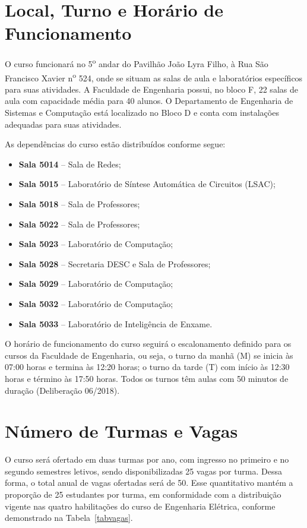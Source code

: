 \section{Local, Turno e Horário de Funcionamento}

O curso funcionará no 5\textsuperscript{o} andar do Pavilhão João Lyra Filho, à Rua São Francisco Xavier n\textsuperscript{o} 524, onde se situam as salas de aula e laboratórios específicos para suas atividades. A Faculdade de Engenharia possui, no bloco F, 22 salas de aula com capacidade média
para 40 alunos. O Departamento de Engenharia de Sistemas e Computação está localizado no Bloco D e conta com instalações adequadas para suas atividades.



As dependências do curso estão distribuídos conforme segue:
\begin{itemize}
    \item \textbf{Sala 5014} -- Sala de Redes;
    \item \textbf{Sala 5015} -- Laboratório de Síntese Automática de Circuitos (LSAC);
    \item \textbf{Sala 5018} -- Sala de Professores;
    \item \textbf{Sala 5022} -- Sala de Professores;
    \item \textbf{Sala 5023} -- Laboratório de Computação;
    \item \textbf{Sala 5028} -- Secretaria DESC e Sala de Professores;
    \item \textbf{Sala 5029} -- Laboratório de Computação;
    \item \textbf{Sala 5032} -- Laboratório de Computação;
    \item \textbf{Sala 5033} -- Laboratório de Inteligência de Enxame.
\end{itemize}


O horário de funcionamento do curso seguirá o escalonamento definido para os cursos da Faculdade de Engenharia, ou seja, o turno da manhã (M) se inicia às 07:00 horas e termina às 12:20 horas; o turno da tarde (T) com início às 12:30 horas e término às 17:50 horas. Todos os turnos têm aulas com 50 minutos de duração (Deliberação  06/2018).

\section{Número de Turmas e Vagas}
O curso será ofertado em duas turmas por ano, com ingresso no primeiro e no segundo semestres letivos, sendo disponibilizadas 25 vagas por turma. Dessa forma, o total anual de vagas ofertadas será de 50. Esse quantitativo mantém a proporção de 25 estudantes por turma, em conformidade com a distribuição vigente nas quatro habilitações do curso de Engenharia Elétrica, conforme demonstrado na Tabela~\ref{tabvagas}.

